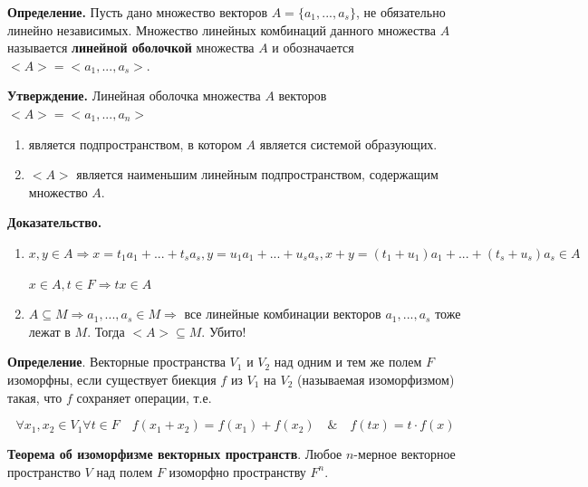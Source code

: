 \documentclass[a4paper]{article}
\begin{document}
	\textbf{Определение.} Пусть дано множество векторов $A = \{ a_1, ..., a_s \}$, не обязательно линейно независимых. Множество линейных комбинаций данного множества $A$ называется \textbf{линейной оболочкой} множества $A$ и обозначается $<A> = <a_1, ..., a_s>$.
	
	\begin{htheorem}
		\textbf{Утверждение.} Линейная оболочка множества $A$ векторов $<A> = <a_1, ..., a_n>$
		 \begin{enumerate}
		 	\item является подпространством, в котором $A$ является системой образующих.
		 	\item $<A>$ является наименьшим линейным подпространством, содержащим множество $A$.
		 \end{enumerate}
	\end{htheorem}
	
	\begin{hproof}
		\textbf{Доказательство.} 
		\begin{enumerate}
			\item $x, y \in A \Rightarrow x = t_1a_1 + ... + t_sa_s, y = u_1a_1 + ... + u_sa_s, x+y = (t_1+u_1)a_1 + ... + (t_s+u_s)a_s \in A$
			
			$x \in A, t \in F \Rightarrow tx \in A$
			
			\item $A \subseteq M \Rightarrow a_1, ..., a_s \in M \Rightarrow$ все линейные комбинации векторов $a_1, ..., a_s$ тоже лежат в $M$. Тогда $<A> \subseteq M$. Убито!
		\end{enumerate}
	\end{hproof}
	
    \textbf{Определение}. Векторные пространства $V_1$ и $V_2$ над одним и тем же полем $F$ изоморфны, если существует биекция $f$ из $V_1$ на $V_2$ (называемая изоморфизмом) такая, что $f$ сохраняет операции, т.е.


    \begin{equation}
        \forall x_1, x_2 \in V_1 \forall t \in F \quad f(x_1+x_2) = f(x_1) + f(x_2) \quad \& \quad f(tx) = t \cdot f(x)
    \end{equation}

    \begin{htheorem}
        \textbf{Теорема об изоморфизме векторных пространств}. Любое $n$-мерное векторное пространство $V$ над полем $F$ изоморфно
        пространству $F^n$.
    \end{htheorem}
\end{document}
